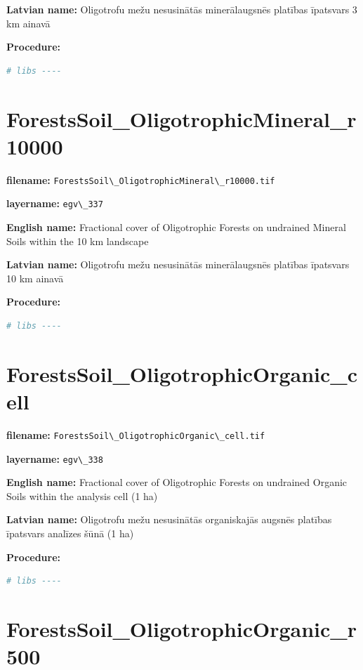 \documentclass[
]{book}
\newcommand{\passthrough}[1]{#1}
\begin{document}
\textbf{Latvian name:} Oligotrofu mežu nesusinātās minerālaugsnēs platības īpatsvars 3 km ainavā

\textbf{Procedure:}

\begin{lstlisting}[language=R]
# libs ----
\end{lstlisting}

\section{ForestsSoil\_OligotrophicMineral\_r10000}\label{ch06.337}

\textbf{filename:} \passthrough{\lstinline!ForestsSoil\_OligotrophicMineral\_r10000.tif!}

\textbf{layername:} \passthrough{\lstinline!egv\_337!}

\textbf{English name:} Fractional cover of Oligotrophic Forests on undrained Mineral Soils within the 10 km landscape

\textbf{Latvian name:} Oligotrofu mežu nesusinātās minerālaugsnēs platības īpatsvars 10 km ainavā

\textbf{Procedure:}

\begin{lstlisting}[language=R]
# libs ----
\end{lstlisting}

\section{ForestsSoil\_OligotrophicOrganic\_cell}\label{ch06.338}

\textbf{filename:} \passthrough{\lstinline!ForestsSoil\_OligotrophicOrganic\_cell.tif!}

\textbf{layername:} \passthrough{\lstinline!egv\_338!}

\textbf{English name:} Fractional cover of Oligotrophic Forests on undrained Organic Soils within the analysis cell (1 ha)

\textbf{Latvian name:} Oligotrofu mežu nesusinātās organiskajās augsnēs platības īpatsvars analīzes šūnā (1 ha)

\textbf{Procedure:}

\begin{lstlisting}[language=R]
# libs ----
\end{lstlisting}

\section{ForestsSoil\_OligotrophicOrganic\_r500}\label{ch06.339}
\end{document}
